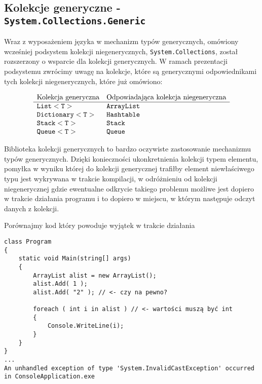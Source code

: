 \subsection{Kolekcje generyczne - {\tt System.Collections.Generic}}

Wraz z wyposażeniem języka w mechanizm typów generycznych, omówiony wcześniej podsystem kolekcji niegenerycznych, 
{\tt System.Collections}, został rozszerzony o wsparcie dla kolekcji generycznych. W ramach prezentacji podsystemu zwrócimy
uwagę na kolekcje, które są generycznymi odpowiednikami tych kolekcji niegenerycznych, które już omówiono:

\begin{center}
$$\begin{array}{ll}
\mbox{Kolekcja generyczna} & \mbox{Odpowiadająca kolekcja niegeneryczna}  \\
\hline 
{\tt List<T>} & {\tt ArrayList} \\
{\tt Dictionary<T>} & {\tt Hashtable} \\
{\tt Stack<T>} & {\tt Stack} \\
{\tt Queue<T>} & {\tt Queue} 
\end{array}$$
\end{center}

Biblioteka kolekcji generycznych to bardzo oczywiste zastosowanie mechanizmu typów generycznych. Dzięki konieczności
ukonkretnienia kolekcji typem elementu, pomyłka w wyniku której do kolekcji generycznej trafiłby element niewłaściwego typu
jest wykrywana w trakcie kompilacji, w odróżnieniu od kolekcji niegenerycznej gdzie ewentualne odkrycie takiego problemu
możliwe jest dopiero w trakcie działania programu i to dopiero w miejscu, w którym następuje odczyt danych z kolekcji.

Porównajmy kod który powoduje wyjątek w trakcie działania

\begin{scriptsize}
\begin{verbatim}
class Program
{
    static void Main(string[] args)
    {
        ArrayList alist = new ArrayList();
        alist.Add( 1 );
        alist.Add( "2" ); // <- czy na pewno?

        foreach ( int i in alist ) // <- wartości muszą być int
        {
            Console.WriteLine(i);
        }
    }
}
...
An unhandled exception of type 'System.InvalidCastException' occurred in ConsoleApplication.exe
\end{verbatim}
\end{scriptsize}

